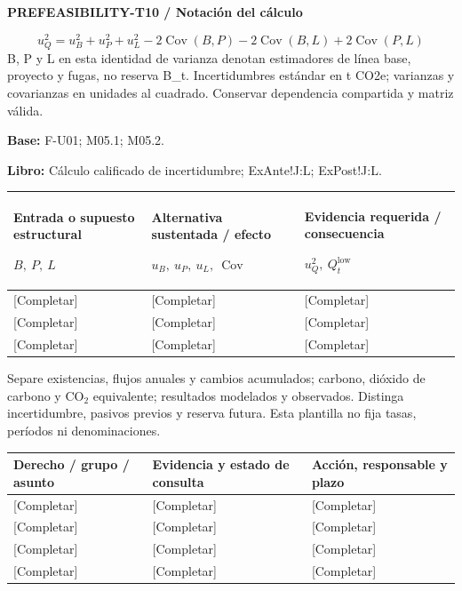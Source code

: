 \textbf{PREFEASIBILITY-T10 / Notación del cálculo}\par
{\fontsize{9}{11}\selectfont\[ u_Q^2=u_B^2+u_P^2+u_L^2-2\operatorname{Cov}(B,P)-2\operatorname{Cov}(B,L)+2\operatorname{Cov}(P,L) \]}
B, P y L en esta identidad de varianza denotan estimadores de línea base, proyecto y fugas, no reserva B\_t. Incertidumbres estándar en t CO2e; varianzas y covarianzas en unidades al cuadrado. Conservar dependencia compartida y matriz válida.\par
\textbf{Base:} F-U01; M05.1; M05.2.\par
\textbf{Libro:} Cálculo calificado de incertidumbre; ExAnte!J:L; ExPost!J:L.\par\endgroup
{\sffamily\fontsize{8.3}{10.3}\selectfont\begin{longtable}{@{}P{52.79mm} P{56.09mm} P{56.09mm}@{}}
\toprule
\textbf{Entrada o supuesto estructural}\par {\normalfont\fontsize{8.2}{10}\selectfont $B,\ P,\ L$} & \textbf{Alternativa sustentada / efecto}\par {\normalfont\fontsize{8.2}{10}\selectfont $u_B,\ u_P,\ u_L,\ \operatorname{Cov}$} & \textbf{Evidencia requerida / consecuencia}\par {\normalfont\fontsize{8.2}{10}\selectfont $u_Q^2,\ Q_t^{\mathrm{low}}$}\\\midrule\endhead
\rule{0pt}{7.7mm}[Completar] & [Completar] & [Completar]\\\hline
\rule{0pt}{7.7mm}[Completar] & [Completar] & [Completar]\\\hline
\rule{0pt}{7.7mm}[Completar] & [Completar] & [Completar]\\\hline
\end{longtable}}
\begin{Notice}Separe existencias, flujos anuales y cambios acumulados; carbono, dióxido de carbono y CO$_2$ equivalente; resultados modelados y observados. Distinga incertidumbre, pasivos previos y reserva futura. Esta plantilla no fija tasas, períodos ni denominaciones.\end{Notice}
{\sffamily\fontsize{8.3}{10.3}\selectfont\begin{longtable}{@{}P{52.79mm} P{57.74mm} P{54.44mm}@{}}
\toprule
\textbf{Derecho / grupo / asunto} & \textbf{Evidencia y estado de consulta} & \textbf{Acción, responsable y plazo}\\\midrule\endhead
\rule{0pt}{7.7mm}[Completar] & [Completar] & [Completar]\\\hline
\rule{0pt}{7.7mm}[Completar] & [Completar] & [Completar]\\\hline
\rule{0pt}{7.7mm}[Completar] & [Completar] & [Completar]\\\hline
\rule{0pt}{7.7mm}[Completar] & [Completar] & [Completar]\\\hline
\end{longtable}}

